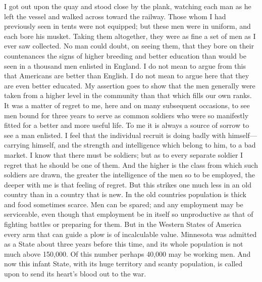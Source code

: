 I got out upon the quay and stood close by the plank, watching each
man as he left the vessel and walked across toward the railway.
Those whom I had previously seen in tents were not equipped; but
these men were in uniform, and each bore his musket.  Taking them
altogether, they were as fine a set of men as I ever saw collected.
No man could doubt, on seeing them, that they bore on their
countenances the signs of higher breeding and better education than
would be seen in a thousand men enlisted in England.  I do not mean
to argue from this that Americans are better than English.  I do
not mean to argue here that they are even better educated.  My
assertion goes to show that the men generally were taken from a
higher level in the community than that which fills our own ranks.
It was a matter of regret to me, here and on many subsequent
occasions, to see men bound for three years to serve as common
soldiers who were so manifestly fitted for a better and more useful
life.  To me it is always a source of sorrow to see a man enlisted.
I feel that the individual recruit is doing badly with himself---%
carrying himself, and the strength and intelligence which belong to
him, to a bad market.  I know that there must be soldiers; but as
to every separate soldier I regret that he should be one of them.
And the higher is the class from which such soldiers are drawn, the
greater the intelligence of the men so to be employed, the deeper
with me is that feeling of regret.  But this strikes one much less
in an old country than in a country that is new.  In the old
countries population is thick and food sometimes scarce.  Men can
be spared; and any employment may be serviceable, even though that
employment be in itself so unproductive as that of fighting battles
or preparing for them.  But in the Western States of America every
arm that can guide a plow is of incalculable value.  Minnesota was
admitted as a State about three years before this time, and its
whole population is not much above 150,000.  Of this number perhaps
40,000 may be working men.  And now this infant State, with its
huge territory and scanty population, is called upon to send its
heart's blood out to the war.

